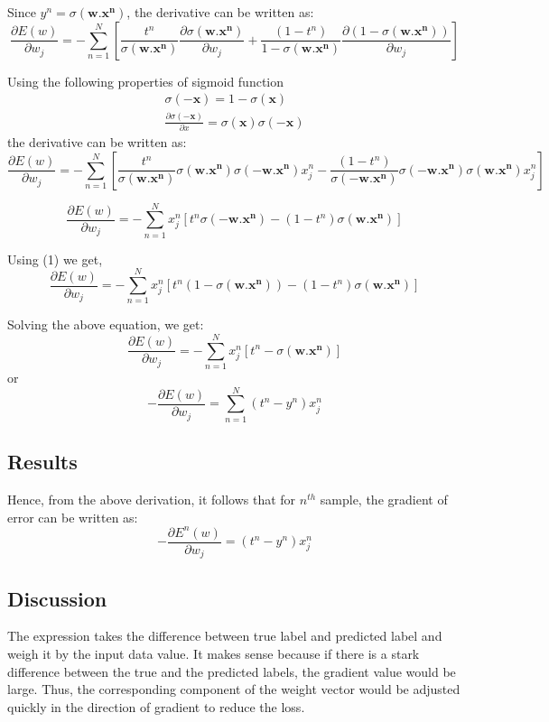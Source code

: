 \documentclass{article}
\begin{document}
Since $y^{n} = \sigma(\mathbf{w.x^{n}})$, the derivative can be written as:
$$\frac{\partial E(w)}{\partial w_j} = - \sum_{n=1}^{N} \left[ \frac{t^{n}}{\sigma(\mathbf{w.x^{n}})} \frac{\partial \sigma(\mathbf{w.x^{n}})}{\partial w_j} + \frac{( 1-t^{n})}{1-\sigma(\mathbf{w.x^{n}})} \frac{\partial ( 1-\sigma(\mathbf{w.x^{n}}))} {\partial w_j}\right]$$

Using the following properties of sigmoid function
\begin{align}
\sigma(-\mathbf{x}) = 1 - \sigma(\mathbf{x})	\\
\frac{\partial \sigma(-\mathbf{x})}{\partial x} = \sigma(\mathbf{x}) \sigma(-\mathbf{x})
\end{align}
the derivative can be written as:
$$\frac{\partial E(w)}{\partial w_j} = - \sum_{n=1}^{N} \left[ \frac{t^{n}}{\sigma(\mathbf{w.x^{n}})} \sigma(\mathbf{w.x^{n}}) \sigma(-\mathbf{w.x^{n}}) x_{j}^{n}  - \frac{( 1-t^{n})}{\sigma(-\mathbf{w.x^{n}})} \sigma(-\mathbf{w.x^{n}}) \sigma(\mathbf{w.x^{n}}) x_{j}^{n} \right]$$

$$\frac{\partial E(w)}{\partial w_j} = - \sum_{n=1}^{N} x_{j}^{n} \left[ t^{n} \sigma(-\mathbf{w.x^{n}})   - ( 1-t^{n}) \sigma(\mathbf{w.x^{n}}) \right]$$

Using (1) we get,
$$\frac{\partial E(w)}{\partial w_j} = - \sum_{n=1}^{N} x_{j}^{n} \left[ t^{n} (1-\sigma(\mathbf{w.x^{n}}))   - ( 1-t^{n}) \sigma(\mathbf{w.x^{n}}) \right]$$

Solving the above equation, we get:
$$\frac{\partial E(w)}{\partial w_j} = - \sum_{n=1}^{N} x_{j}^{n} \left[ t^{n} - \sigma(\mathbf{w.x^{n}}) \right]$$
or
$$-\frac{\partial E(w)}{\partial w_j} = \sum_{n=1}^{N} (t^{n} - y^{n}) x_{j}^{n}$$

\subsection{Results}

Hence, from the above derivation, it follows that for $n^{th}$ sample, the gradient of error can be written as:
$$-\frac{\partial E^{n}(w)}{\partial w_j} = (t^{n} - y^{n}) x_{j}^{n}$$

\subsection{Discussion}
The expression takes the difference between true label and predicted label and weigh it by the input data value. It makes sense because if there is a stark difference between the true and the predicted labels, the gradient value would be large. Thus, the corresponding component of the weight vector would be adjusted quickly in the direction of gradient to reduce the loss.
\end{document}
